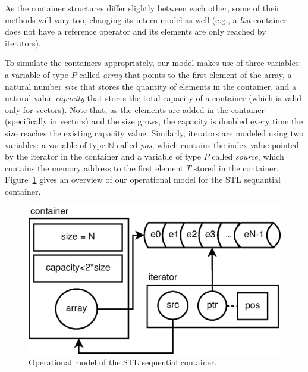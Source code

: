\documentclass[conference]{IEEEtran}
\begin{document}
As the container structures differ slightly
between each other, some of their methods will vary too,
changing its intern model as well (e.g., a \textit{list}
container does not have a reference operator and its elements
are only reached by iterators).

To simulate the containers appropriately, our model makes
use of three variables: a variable of type $P$ called \emph{array} that points
to the first element of the array, a natural number \emph{size} that stores
the quantity of elements in the container, and a natural value \emph{capacity}
that stores the total capacity of a container (which is valid only for vectors).
Note that, as the elements are added in the container (specifically in vectors)
and the size grows, the capacity is doubled every time
the size reaches the existing capacity value. Similarly, iterators are modeled using
two variables: a variable of type $\mathbb{N}$ called \emph{pos},
which contains the index value pointed by the iterator in the container and a
variable of type $P$ called \emph{source}, which contains the memory address to the first
element $T$ stored in the container. Figure~\ref{figure:stl-iterator} gives
an overview of our operational model for the STL sequantial container.


\begin{figure}[ht] \centering
\includegraphics[scale=0.3]{figures/stl-iterator}
\caption{Operational model of the STL sequential container.} 
\label{figure:stl-iterator}
\end{figure}
\end{document}
